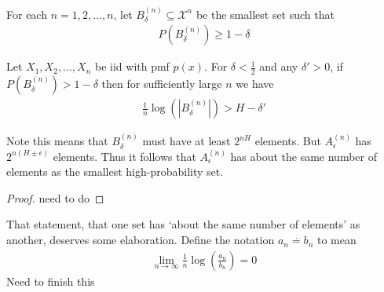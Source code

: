 For each $n = 1,2,\ldots,n$, let $B_{\delta}^{(n)} \subseteq \mathcal{X}^n$ be the smallest set such that 
\begin{align}
	P(B_{\delta}^{(n)}) \geq 1-\delta
\end{align}
\begin{theorem}
	Let $X_1, X_2,\ldots,X_n$ be iid with pmf $p(x)$. For $\delta < \frac{1}{2}$ and any $\delta' > 0$, if $P(B_{\delta}^{(n)}) > 1-\delta$ then for sufficiently large $n$ we have 
	\begin{align}
		\frac{1}{n}\log(|B_{\delta}^{(n)}|) > H- \delta'
	\end{align}
\end{theorem}
Note this means that $B_{\delta}^{(n)}$ must have at least $2^{nH}$ elements. But $A_{\epsilon}^{(n)}$ has $2^{n(H\pm \epsilon)}$ elements. Thus it follows that $A^{(n)}_{\epsilon}$ has about the same number of elements as the smallest high-probability set.
\begin{proof}
	need to do
\end{proof}
That statement, that one set has `about the same number of elements' as another, deserves some elaboration. Define the notation $a_n \overset{.}{=} b_n$ to mean 
\begin{align}
	\lim_{n \to \infty} \frac{1}{n}\log\left(\frac{a_n}{b_n} \right) = 0
\end{align}
Need to finish this

